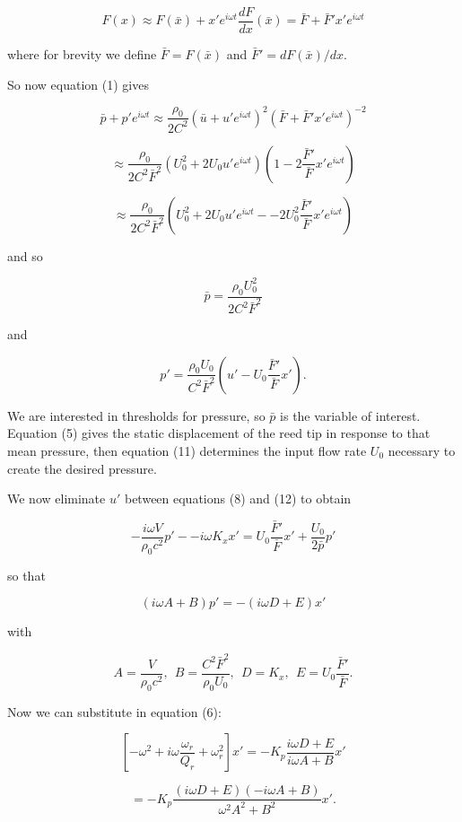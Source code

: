   $$F(x) \approx F(\bar{x}) + x' e^{i \omega t} 
  \dfrac{dF}{dx}(\bar{x})=\bar{F}+\bar{F}' x' e^{i \omega t}\tag{9}$$ 

  where for brevity we define $\bar{F}=F(\bar{x})$ and 
  $\bar{F}'=dF(\bar{x})/dx$. 

  So now equation (1) gives 

  $$\bar{p}+p'e^{i \omega t}\approx \dfrac{\rho_0}{2C^2}\left( \bar{u}+u'e^{i 
  \omega t} \right)^2\left(\bar{F}+\bar{F}' x' e^{i \omega t} \right)^{-2}$$ 

  $$\approx \dfrac{\rho_0}{2C^2 \bar{F}^2}\left( U_0^2 + 2 U_0 u' e^{i \omega 
  t} \right) \left(1-2\dfrac{\bar{F}'}{\bar{F}} x' e^{i \omega t} \right)$$ 

  $$\approx \dfrac{\rho_0}{2C^2 \bar{F}^2}\left( U_0^2 +2 U_0 u' e^{i \omega t} 
  -- 2U_0^2 \dfrac{\bar{F}'}{\bar{F}} x' e^{i \omega t} \right)\tag{10}$$ 

  and so 

  $$\bar{p} =\dfrac{\rho_0 U_0^2}{2C^2 \bar{F}^2}\tag{11}$$ 

  and 

  $$p'=\dfrac{\rho_0 U_0}{C^2 \bar{F}^2}\left(u'-U_0 
  \dfrac{\bar{F}'}{\bar{F}}x' \right). \tag{12}$$ 

  We are interested in thresholds for pressure, so $\bar{p}$ is the variable of 
  interest. Equation (5) gives the static displacement of the reed tip in 
  response to that mean pressure, then equation (11) determines the input flow 
  rate $U_0$ necessary to create the desired pressure. 

  We now eliminate $u'$ between equations (8) and (12) to obtain 

  $$-\dfrac{i \omega V}{\rho_0 c^2}p' -- i \omega K_x x' = U_0 
  \dfrac{\bar{F}'}{\bar{F}} x' + \dfrac{U_0}{2 \bar{p}}p' \tag{13}$$ 

  so that 

  $$(i \omega A +B)p'=-(i \omega D + E)x' \tag{14}$$ 

  with 

  $$A=\dfrac{V}{\rho_0 c^2} \mathrm{,~~} B=\dfrac{C^2 \bar{F}^2}{\rho_0 U_0} 
  \mathrm{,~~} D=K_x \mathrm{,~~} E=U_0 \dfrac{\bar{F}'}{\bar{F}} . \tag{15}$$ 

  Now we can substitute in equation (6): 

  $$\left[ -\omega^2 + i \omega \dfrac{\omega_r}{Q_r} + \omega_r^2 \right]x' = 
  -K_p \dfrac{i \omega D + E}{i \omega A + B} x'$$ 

  $$=-K_p \dfrac{(i \omega D + E)(-i \omega A + B)}{\omega^2 A^2 + B^2} x' . 
  \tag{16}$$ 

